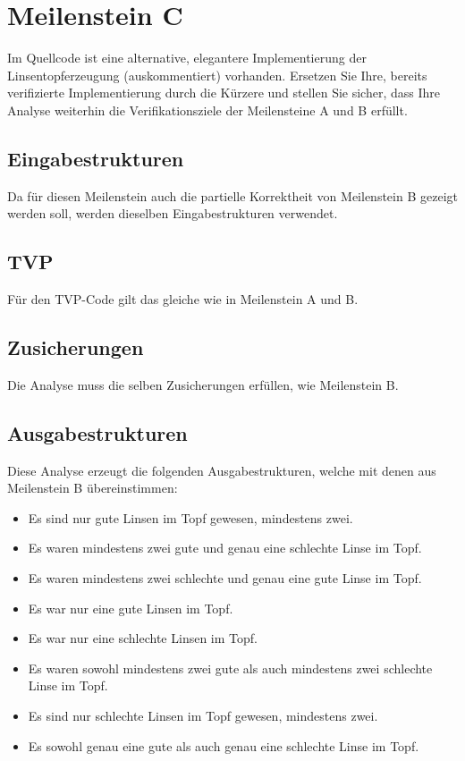 \section{Meilenstein C}
Im Quellcode ist eine alternative, elegantere Implementierung der Linsentopferzeugung (auskommentiert) vorhanden. Ersetzen Sie Ihre, bereits verifizierte Implementierung durch die Kürzere und stellen Sie sicher, dass Ihre Analyse weiterhin die Verifikationsziele der Meilensteine A und B erfüllt.


\subsection{Eingabestrukturen}
Da für diesen Meilenstein auch die partielle Korrektheit von Meilenstein B gezeigt werden soll, werden dieselben Eingabestrukturen verwendet.


\subsection{TVP}
Für den TVP-Code gilt das gleiche wie in Meilenstein A und B.


\subsection{Zusicherungen}
Die Analyse muss die selben Zusicherungen erfüllen, wie Meilenstein B.


\subsection{Ausgabestrukturen}
Diese Analyse erzeugt die folgenden Ausgabestrukturen, welche mit denen aus Meilenstein B übereinstimmen:
\begin{itemize}[$\rightarrow$]
	\item Es sind nur gute Linsen im Topf gewesen, mindestens zwei.
	\item Es waren mindestens zwei gute und genau eine schlechte Linse im Topf.
	\item Es waren mindestens zwei schlechte und genau eine gute Linse im Topf.
	\item Es war nur eine gute Linsen im Topf.
	\item Es war nur eine schlechte Linsen im Topf.
	\item Es waren sowohl mindestens zwei gute als auch mindestens zwei schlechte Linse im Topf.
	\item Es sind nur schlechte Linsen im Topf gewesen, mindestens zwei.
	\item Es sowohl genau eine gute als auch genau eine schlechte Linse im Topf.
\end{itemize}
